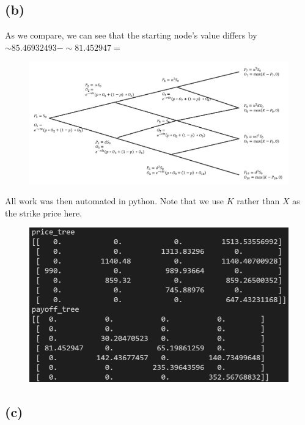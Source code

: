\documentclass{article}
\begin{document}
{\newpage

\subsection*{(b)}

As we compare, we can see that the starting node's value differs by $\sim 85.46932493 - \sim 81.452947 = $ 

\begin{figure}[h]
  \centering
  \includegraphics[width=120mm]{./2b_tree.png}
\end{figure}

All work was then automated in python. Note that we use $K$ rather than $X$ as the strike price here. 

\begin{figure}[h]
  \centering
  \includegraphics[width=120mm]{./2b.png}
\end{figure}

\subsection*{(c)}


}
\end{document}
